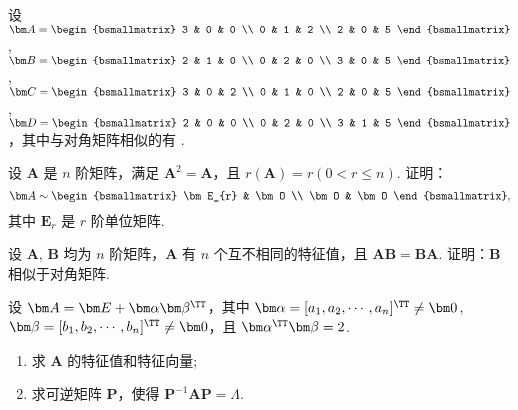 	\begin{titwo}
		设 $\bm A = \begin{bsmallmatrix}
			3 & 0 & 0 \\
			0 & 1 & 2 \\
			2 & 0 & 5
		\end{bsmallmatrix}$, $\bm B = \begin{bsmallmatrix}
			2 & 1 & 0 \\
			0 & 2 & 0 \\
			3 & 0 & 5
		\end{bsmallmatrix}$, $\bm C = \begin{bsmallmatrix}
			3 & 0 & 2 \\
			0 & 1 & 0 \\
			2 & 0 & 5
		\end{bsmallmatrix}$, $\bm D = \begin{bsmallmatrix}
			2 & 0 & 0 \\
			0 & 2 & 0 \\
			3 & 1 & 5
		\end{bsmallmatrix}$，其中与对角矩阵相似的有 \kuo.

	\end{titwo}

	\begin{titwo}
		设 $\bm A$ 是 $n$ 阶矩阵，满足 $\bm A^{2} = \bm A$，且 $r(\bm A) = r (0 < r \leq n)$. 证明：
		\[
			\bm A \sim \begin{bsmallmatrix}
				\bm E_{r} & \bm O \\
				\bm O & \bm O
			\end{bsmallmatrix},
		\]
		其中 $\bm E_{r}$ 是 $r$ 阶单位矩阵.
	\end{titwo}

	\begin{titwo}
		设 $\bm A$, $\bm B$ 均为 $n$ 阶矩阵，$\bm A$ 有 $n$ 个互不相同的特征值，且 $\bm A \bm B = \bm B \bm A$. 证明：$\bm B$ 相似于对角矩阵.
	\end{titwo}

	\begin{titwo}
		设 $\bm A = \bm E + \bm \alpha \bm \beta^{\TT}$，其中 $\bm \alpha = [a_{1},a_{2},\cdots,a_{n}]^{\TT} \ne \bm 0$, $\bm \beta = [b_{1},b_{2},\cdots,b_{n}]^{\TT} \ne \bm 0$，且 $\bm \alpha^{\TT} \bm \beta = 2$.
		\begin{enumerate}
			\item 求 $\bm A$ 的特征值和特征向量;
			\item 求可逆矩阵 $\bm P$，使得 $\bm P^{-1} \bm A \bm P = \bm \varLambda$.
		\end{enumerate}
	\end{titwo}

